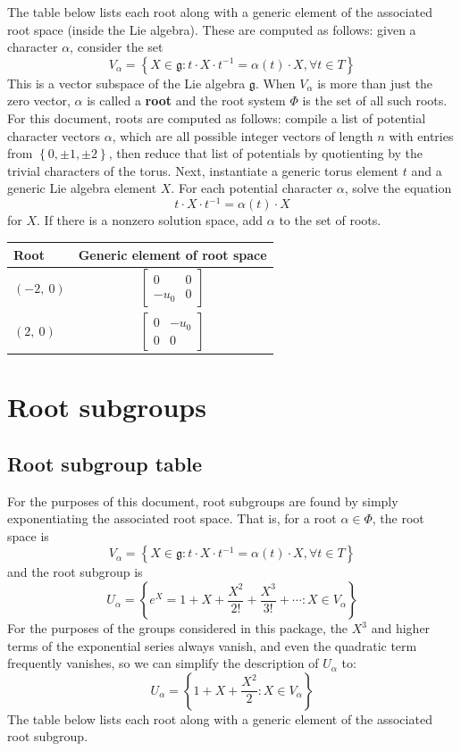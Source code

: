\documentclass[11pt]{article}
\newcommand{\noi}{\noindent}
\newcommand{\tbf}{\textbf}
\newcommand{\inv}{^{-1}}
\newcommand{\lb}{\left\{}
\newcommand{\rb}{\right\}}
\newcommand{\frakg}{\mathfrak{g}}
\theoremstyle{definition}
\begin{document}
\noi The table below lists each root along with a generic element of the associated root space (inside the Lie algebra). These are computed as follows: given a character $\alpha$, consider the set
\[
	V_\alpha = \lb X \in \frakg : t \cdot X \cdot t \inv = \alpha(t) \cdot X, \forall t \in T \rb
\]
This is a vector subspace of the Lie algebra $\frakg$. When $V_\alpha$ is more than just the zero vector, $\alpha$ is called a \tbf{root} and the root system $\Phi$ is the set of all such roots. For this document, roots are computed as follows: compile a list of potential character vectors $\alpha$, which are all possible integer vectors of length $n$ with entries from $\lb 0, \pm 1, \pm 2 \rb$, then reduce that list of potentials by quotienting by the trivial characters of the torus. Next, instantiate a generic torus element $t$ and a generic Lie algebra element $X$. For each potential character $\alpha$, solve the equation
\[
	t \cdot X \cdot t \inv = \alpha(t) \cdot X
\]
for $X$. If there is a nonzero solution space, add $\alpha$ to the set of roots.

\bigskip

\noindent \begin{longtable}{|l|c|}
    \hline
    \textbf{Root} & \textbf{Generic element of root space} \\
    \hline
    \endhead
    $\left( -2, \  0\right)$ & ${\left[\begin{matrix}0 & 0\\- u_{0} & 0\end{matrix}\right]}$ \\
    \hline
    $\left( 2, \  0\right)$ & ${\left[\begin{matrix}0 & - u_{0}\\0 & 0\end{matrix}\right]}$ \\
    \hline
\end{longtable}


\newpage
\section{Root subgroups}

\subsection{Root subgroup table}

\noi For the purposes of this document, root subgroups are found by simply exponentiating the associated root space. That is, for a root $\alpha \in \Phi$, the root space is
\[
	V_\alpha = \lb X \in \frakg : t \cdot X \cdot t \inv = \alpha(t) \cdot X, \forall t \in T \rb
\]
and the root subgroup is
\[
	U_\alpha = \lb e^X = 1 + X + \frac{X^2}{2!} + \frac{X^3}{3!} + \cdots : X \in V_\alpha \rb
\]
For the purposes of the groups considered in this package, the $X^3$ and higher terms of the exponential series always vanish, and even the quadratic term frequently vanishes, so we can simplify the description of $U_\alpha$ to:
\[
	U_\alpha = \lb 1 + X + \frac{X^2}{2} : X \in V_\alpha \rb
\]
The table below lists each root along with a generic element of the associated root subgroup.
\end{document}
